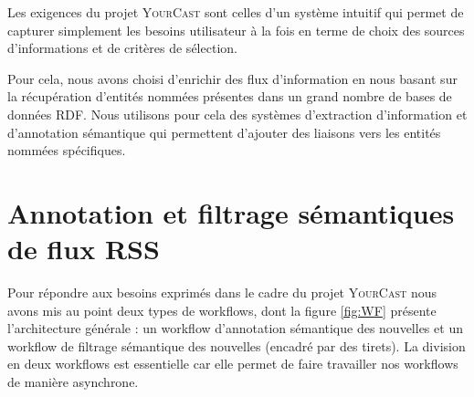 \documentclass[]{easychair}
\newcommand{\comment}[4]{\par\noindent\hspace*{-0.5cm}{\parbox{\columnwidth}{\textbf{\color{#1}//#2[#3]:#4}}}\par}
\newcommand{\ch}[1]{\comment{green}{}{#1}{CH}}
\newcommand{\Y}[0]{\textsc{YourCast}\xspace}
\begin{document}
Les exigences du  projet \Y sont celles d'un système intuitif qui permet de capturer simplement les besoins utilisateur à la fois en terme de choix des sources d'informations et de critères de sélection. %

Pour cela, nous avons choisi d'enrichir des flux d'information en nous basant sur la récupération d'entités nommées présentes dans  un grand nombre de bases de données RDF. Nous utilisons pour cela des systèmes d'extraction d'information et d'annotation sémantique qui permettent d'ajouter des liaisons vers les entités nommées spécifiques.

%




\section{Annotation et filtrage sémantiques de flux RSS}
\label{sect:miseEnOuvre}
Pour répondre aux besoins exprimés dans le cadre du projet \Y nous avons mis au point deux types de workflows, dont la figure \ref{fig:WF} présente  l'architecture générale : un workflow d'annotation sémantique des nouvelles et un workflow de filtrage sémantique des nouvelles (encadré par des tirets). La division en deux workflows est essentielle car elle permet de faire travailler nos workflows de manière asynchrone.
\end{document}

